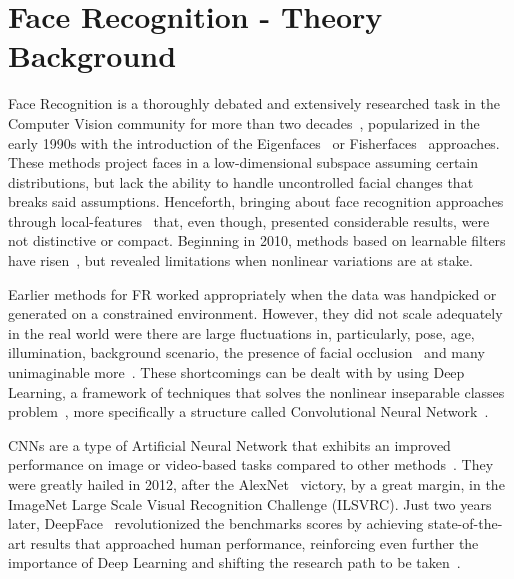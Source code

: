 \documentclass[class=report, crop=false, a4paper, 12pt]{standalone}
\begin{document}

\section{Face Recognition - Theory Background}
Face Recognition is a thoroughly debated and extensively researched task in the Computer Vision community for more than two decades~\autocite{ranjanDeepLearningUnderstanding2018}, popularized in the early 1990s with the introduction of the Eigenfaces~\autocite{turkEigenfacesRecognition1991} or Fisherfaces~\autocite{p.n.belhumeurEigenfacesVsFisherfaces1997} approaches. These methods project faces in a low-dimensional subspace assuming certain distributions, but lack the ability to handle uncontrolled facial changes that breaks said assumptions. Henceforth, bringing about face recognition approaches through local-features~\autocite{chengjunliuGaborFeatureBased2002, ahonenFaceDescriptionLocal2006} that, even though, presented considerable results, were not distinctive or compact. Beginning in 2010, methods based on learnable filters have risen~\autocite{z.caoFaceRecognitionLearningbased2010,leiLearningDiscriminantFace2014}, but revealed limitations when nonlinear variations are at stake.

\par Earlier methods for FR worked appropriately when the data was handpicked or generated on a constrained environment. However, they did not scale adequately in the real world were there are large fluctuations in, particularly, pose, age, illumination, background scenario, the presence of facial occlusion~\autocite{ranjanDeepLearningUnderstanding2018} and many unimaginable more~\autocite{kalkaIJBIARPAJanus2018}. These shortcomings can be dealt with by using Deep Learning, a framework of techniques that solves the nonlinear inseparable classes problem~\autocite{minsky69perceptrons}, more specifically a structure called Convolutional Neural Network~\autocite{wangDeepFaceRecognition2021}. 

\par CNNs are a type of Artificial Neural Network that exhibits an improved performance on image or video-based tasks compared to other methods~\autocite{lecunGradientBasedLearningApplied1998}. They were greatly hailed in 2012, after the AlexNet~\autocite{krizhevskyImageNetClassificationDeep2012} victory, by a great margin, in the ImageNet Large Scale Visual Recognition Challenge (ILSVRC). Just two years later, DeepFace~\autocite{taigmanDeepFaceClosingGap2014} revolutionized the benchmarks scores by achieving state-of-the-art results that approached human performance, reinforcing even further the importance of Deep Learning and shifting the research path to be taken~\autocite{wangDeepFaceRecognition2021}.
\end{document}
